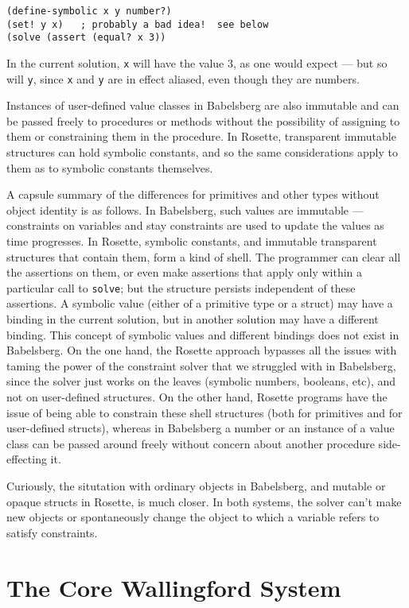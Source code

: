 \documentclass{article}
\begin{document}
\begin{verbatim}
(define-symbolic x y number?)
(set! y x)   ; probably a bad idea!  see below
(solve (assert (equal? x 3))
\end{verbatim}

In the current solution, \verb|x| will have the value 3, as one would
expect --- but so will \verb|y|, since \verb|x| and \verb|y| are in
effect aliased, even though they are numbers.

Instances of user-defined value classes in Babelsberg are also
immutable and can be passed freely to procedures or methods without
the possibility of assigning to them or constraining them in the
procedure.  In Rosette, transparent immutable structures can hold
symbolic constants, and so the same considerations apply to them as to
symbolic constants themselves.

A capsule summary of the differences for primitives and other types
without object identity is as follows.  In Babelsberg, such values are
immutable --- constraints on variables and stay constraints are used
to update the values as time progresses.  In Rosette, symbolic
constants, and immutable transparent structures that contain them,
form a kind of shell.  The programmer can clear all the assertions on
them, or even make assertions that apply only within a particular call
to \verb|solve|; but the structure persists independent of these
assertions.  A symbolic value (either of a primitive type or a struct)
may have a binding in the current solution, but in another solution
may have a different binding.  This concept of symbolic values and
different bindings does not exist in Babelsberg.  On the one hand, the
Rosette approach bypasses all the issues with taming the power of the
constraint solver that we struggled with in Babelsberg, since the
solver just works on the leaves (symbolic numbers, booleans, etc), and
not on user-defined structures.  On the other hand, Rosette programs
have the issue of being able to constrain these shell structures (both
for primitives and for user-defined structs), whereas in Babelsberg a
number or an instance of a value class can be passed around freely
without concern about another procedure side-effecting it.

Curiously, the situtation with ordinary objects in Babelsberg, and
mutable or opaque structs in Rosette, is much closer.  In both
systems, the solver can't make new objects or spontaneously change the
object to which a variable refers to satisfy constraints.

\section{The Core Wallingford System}
\label{sec:core-wallingford}
\end{document}
